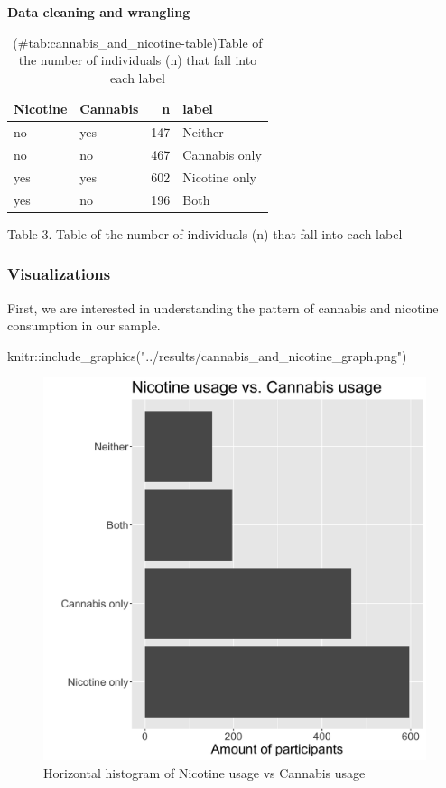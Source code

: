 \documentclass[
]{article}
\newenvironment{Shaded}{\begin{snugshade}}{\end{snugshade}}
\newcommand{\FunctionTok}[1]{\textcolor[rgb]{0.00,0.00,0.00}{#1}}
\newcommand{\NormalTok}[1]{#1}
\newcommand{\SpecialCharTok}[1]{\textcolor[rgb]{0.00,0.00,0.00}{#1}}
\newcommand{\StringTok}[1]{\textcolor[rgb]{0.31,0.60,0.02}{#1}}
\begin{document}
\textbf{Data cleaning and wrangling}

\begin{table}

\caption{(\#tab:cannabis_and_nicotine-table)Table of the number of individuals (n) that fall into each label}
\centering
\begin{tabular}[t]{l|l|r|l}
\hline
Nicotine & Cannabis & n & label\\
\hline
no & yes & 147 & Neither\\
\hline
no & no & 467 & Cannabis only\\
\hline
yes & yes & 602 & Nicotine only\\
\hline
yes & no & 196 & Both\\
\hline
\end{tabular}
\end{table}

Table 3. Table of the number of individuals (n) that fall into each
label

\hypertarget{visualizations}{%
\subsubsection{Visualizations}\label{visualizations}}

First, we are interested in understanding the pattern of cannabis and
nicotine consumption in our sample.

\begin{Shaded}
\begin{Highlighting}[]
\NormalTok{knitr}\SpecialCharTok{::}\FunctionTok{include\_graphics}\NormalTok{(}\StringTok{"../results/cannabis\_and\_nicotine\_graph.png"}\NormalTok{)}
\end{Highlighting}
\end{Shaded}

\begin{figure}
\includegraphics[width=0.5\linewidth]{../results/cannabis_and_nicotine_graph} \caption{Horizontal histogram of Nicotine usage vs Cannabis usage}\label{fig:cannabis-nicotine}
\end{figure}
\end{document}
